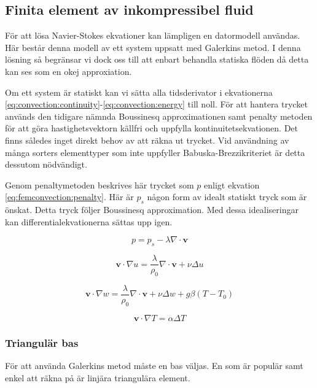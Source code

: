 \subsection{Finita element av inkompressibel fluid}

För att lösa Navier-Stokes ekvationer kan lämpligen en datormodell användas.
Här består denna modell av ett system uppsatt med Galerkins metod.
I denna lösning så begränsar vi dock oss till att enbart behandla statiska flöden
då detta kan ses som en okej approxiation.

Om ett system är statiskt kan vi sätta alla tidsderivator i ekvationerna
\eqref{eq:convection:continuity}-\eqref{eq:convection:energy} till noll.
För att hantera trycket används den tidigare nämnda Boussinesq approximationen
samt penalty metoden för att göra hastighetsvektorn källfri och uppfylla
kontinuitetsekvationen. Det finns således inget direkt behov av att räkna ut trycket.
Vid användning av många sorters elementtyper som inte uppfyller Babuska-Brezzikriteriet
är detta dessutom nödvändigt.\cite{babuska1973}\cite{segal2011}

Genom penaltymetoden beskrives här trycket som $p$ enligt ekvation
\eqref{eq:femconvection:penalty}. Här är $p_s$ någon form av idealt statiskt
tryck som är önskat. Detta tryck följer Boussinesq approximation. Med dessa
idealiseringar kan differentialekvationerna sättas upp igen. \cite{heinrich88}\cite{taylor79}

\begin{equation}
\label{eq:femconvection:penalty}
p = p_s - \lambda\nabla\cdot\mathbf{v}
\end{equation}


\begin{equation}
\label{eq:femconvection:u}
\mathbf{v}\cdot\nabla u =
\frac{\lambda}{\rho_0}\nabla\cdot\mathbf{v} +
\nu\Delta u
\end{equation}

\begin{equation}
\label{eq:femconvection:w}
\mathbf{v}\cdot\nabla w =
\frac{\lambda}{\rho_0}\nabla\cdot\mathbf{v} + \nu\Delta w +g\beta(T-T_0)
\end{equation}

\begin{equation}
\label{eq:femconvection:T}
\mathbf{v}\cdot\nabla T = \alpha\Delta T
\end{equation}


\subsubsection{Triangulär bas}
För att använda Galerkins metod måste en bas väljas. En som är populär samt
enkel att räkna på är linjära triangulära element. 
